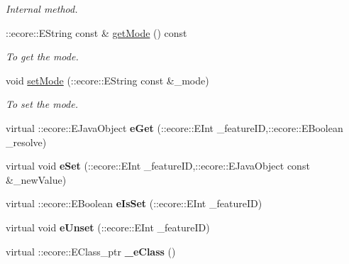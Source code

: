 \begin{DoxyCompactItemize}
\begin{DoxyCompactList}\small\item\em Internal method. \item\end{DoxyCompactList}\item 
::ecore::EString const \& \hyperlink{classFMS__Data_1_1ChModOptions_a1ae8bc9062114a6c37f30c168a5d6cc2}{getMode} () const 
\begin{DoxyCompactList}\small\item\em To get the mode. \item\end{DoxyCompactList}\item 
void \hyperlink{classFMS__Data_1_1ChModOptions_a6245ab626e364f06c77e945b43bddb9d}{setMode} (::ecore::EString const \&\_\-mode)
\begin{DoxyCompactList}\small\item\em To set the mode. \item\end{DoxyCompactList}\item 
\hypertarget{classFMS__Data_1_1ChModOptions_ad38c8624ba3b93e5be1f64561002febc}{
virtual ::ecore::EJavaObject {\bfseries eGet} (::ecore::EInt \_\-featureID,::ecore::EBoolean \_\-resolve)}
\label{classFMS__Data_1_1ChModOptions_ad38c8624ba3b93e5be1f64561002febc}

\item 
\hypertarget{classFMS__Data_1_1ChModOptions_a9f6dda616790e8acf670518db2dd436d}{
virtual void {\bfseries eSet} (::ecore::EInt \_\-featureID,::ecore::EJavaObject const \&\_\-newValue)}
\label{classFMS__Data_1_1ChModOptions_a9f6dda616790e8acf670518db2dd436d}

\item 
\hypertarget{classFMS__Data_1_1ChModOptions_ab4ee2998b5dc73c4447ddeaeb437b44a}{
virtual ::ecore::EBoolean {\bfseries eIsSet} (::ecore::EInt \_\-featureID)}
\label{classFMS__Data_1_1ChModOptions_ab4ee2998b5dc73c4447ddeaeb437b44a}

\item 
\hypertarget{classFMS__Data_1_1ChModOptions_a919fd85a353b9fa75bcc372acd9500c3}{
virtual void {\bfseries eUnset} (::ecore::EInt \_\-featureID)}
\label{classFMS__Data_1_1ChModOptions_a919fd85a353b9fa75bcc372acd9500c3}

\item 
\hypertarget{classFMS__Data_1_1ChModOptions_aa87c9043068d72292498441241405634}{
virtual ::ecore::EClass\_\-ptr {\bfseries \_\-eClass} ()}
\label{classFMS__Data_1_1ChModOptions_aa87c9043068d72292498441241405634}

\end{DoxyCompactItemize}
